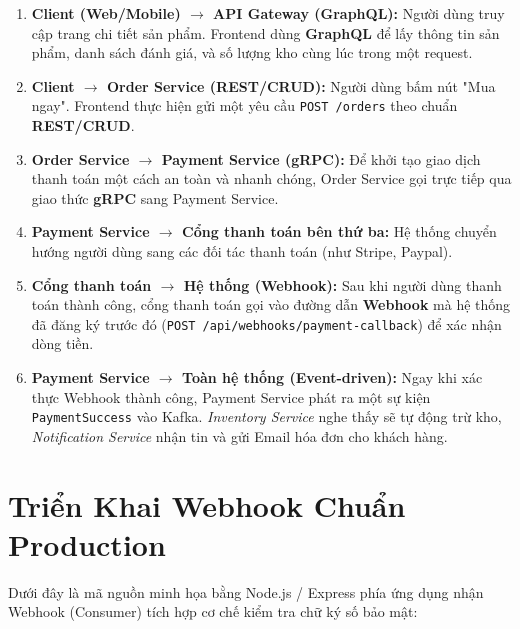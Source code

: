 \documentclass[12pt,a4paper]{article}
\begin{document}
\begin{enumerate}
    \item \textbf{Client (Web/Mobile) $\rightarrow$ API Gateway (GraphQL):} Người dùng truy cập trang chi tiết sản phẩm. Frontend dùng \textbf{GraphQL} để lấy thông tin sản phẩm, danh sách đánh giá, và số lượng kho cùng lúc trong một request.
    \item \textbf{Client $\rightarrow$ Order Service (REST/CRUD):} Người dùng bấm nút "Mua ngay". Frontend thực hiện gửi một yêu cầu \texttt{POST /orders} theo chuẩn \textbf{REST/CRUD}.
    \item \textbf{Order Service $\rightarrow$ Payment Service (gRPC):} Để khởi tạo giao dịch thanh toán một cách an toàn và nhanh chóng, Order Service gọi trực tiếp qua giao thức \textbf{gRPC} sang Payment Service.
    \item \textbf{Payment Service $\rightarrow$ Cổng thanh toán bên thứ ba:} Hệ thống chuyển hướng người dùng sang các đối tác thanh toán (như Stripe, Paypal).
    \item \textbf{Cổng thanh toán $\rightarrow$ Hệ thống (Webhook):} Sau khi người dùng thanh toán thành công, cổng thanh toán gọi vào đường dẫn \textbf{Webhook} mà hệ thống đã đăng ký trước đó (\texttt{POST /api/webhooks/payment-callback}) để xác nhận dòng tiền.
    \item \textbf{Payment Service $\rightarrow$ Toàn hệ thống (Event-driven):} Ngay khi xác thực Webhook thành công, Payment Service phát ra một sự kiện \texttt{PaymentSuccess} vào Kafka. \textit{Inventory Service} nghe thấy sẽ tự động trừ kho, \textit{Notification Service} nhận tin và gửi Email hóa đơn cho khách hàng.
\end{enumerate}

\section{Triển Khai Webhook Chuẩn Production}
Dưới đây là mã nguồn minh họa bằng Node.js / Express phía ứng dụng nhận Webhook (Consumer) tích hợp cơ chế kiểm tra chữ ký số bảo mật:
\end{document}
